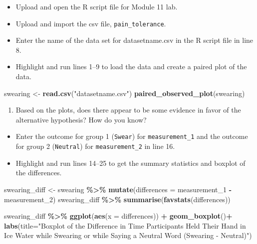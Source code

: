 \documentclass[
]{report}
\newenvironment{Shaded}{\begin{snugshade}}{\end{snugshade}}
\newcommand{\AttributeTok}[1]{\textcolor[rgb]{0.13,0.29,0.53}{#1}}
\newcommand{\FunctionTok}[1]{\textcolor[rgb]{0.13,0.29,0.53}{\textbf{#1}}}
\newcommand{\NormalTok}[1]{#1}
\newcommand{\OtherTok}[1]{\textcolor[rgb]{0.56,0.35,0.01}{#1}}
\newcommand{\SpecialCharTok}[1]{\textcolor[rgb]{0.81,0.36,0.00}{\textbf{#1}}}
\newcommand{\StringTok}[1]{\textcolor[rgb]{0.31,0.60,0.02}{#1}}
\providecommand{\tightlist}{%
  \setlength{\itemsep}{0pt}\setlength{\parskip}{0pt}}
\begin{document}
\vspace{0.5in}

\begin{itemize}
\item
  Upload and open the R script file for Module 11 lab.
\item
  Upload and import the csv file, \texttt{pain\_tolerance}.
\item
  Enter the name of the data set for datasetname.csv in the R script file in line 8.
\item
  Highlight and run lines 1--9 to load the data and create a paired plot of the data.
\end{itemize}

\begin{Shaded}
\begin{Highlighting}[]
\NormalTok{swearing }\OtherTok{\textless{}{-}} \FunctionTok{read.csv}\NormalTok{(}\StringTok{"datasetname.csv"}\NormalTok{)}
\FunctionTok{paired\_observed\_plot}\NormalTok{(swearing)}
\end{Highlighting}
\end{Shaded}

\begin{enumerate}
\def\labelenumi{\arabic{enumi}.}
\setcounter{enumi}{4}
\tightlist
\item
  Based on the plots, does there appear to be some evidence in favor of the alternative hypothesis? How do you know?
  \vspace{0.4in}
\end{enumerate}

\begin{itemize}
\item
  Enter the outcome for group 1 (\texttt{Swear}) for \texttt{measurement\_1} and the outcome for group 2 (\texttt{Neutral}) for \texttt{measurement\_2} in line 16.
\item
  Highlight and run lines 14--25 to get the summary statistics and boxplot of the differences.
\end{itemize}

\begin{Shaded}
\begin{Highlighting}[]
\NormalTok{swearing\_diff }\OtherTok{\textless{}{-}}\NormalTok{ swearing }\SpecialCharTok{\%\textgreater{}\%} 
  \FunctionTok{mutate}\NormalTok{(}\AttributeTok{differences =}\NormalTok{ measurement\_1 }\SpecialCharTok{{-}}\NormalTok{ measurement\_2)}
\NormalTok{swearing\_diff }\SpecialCharTok{\%\textgreater{}\%} 
    \FunctionTok{summarise}\NormalTok{(}\FunctionTok{favstats}\NormalTok{(differences))}

\NormalTok{swearing\_diff }\SpecialCharTok{\%\textgreater{}\%} 
    \FunctionTok{ggplot}\NormalTok{(}\FunctionTok{aes}\NormalTok{(}\AttributeTok{x =}\NormalTok{ differences)) }\SpecialCharTok{+}
    \FunctionTok{geom\_boxplot}\NormalTok{()}\SpecialCharTok{+}
    \FunctionTok{labs}\NormalTok{(}\AttributeTok{title=}\StringTok{"Boxplot of the Difference in Time Participants Held Their Hand }
\StringTok{         in Ice Water while Swearing or while Saying a Neutral Word (Swearing {-} Neutral)"}\NormalTok{)}
\end{Highlighting}
\end{Shaded}
\end{document}
